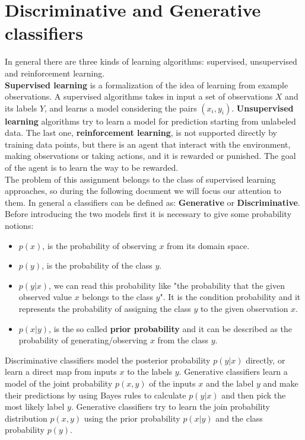 \documentclass[11pt,a4paper]{article}
\begin{document}
\section{Discriminative and Generative classifiers}
In general there are three kinds of learning algorithms: supervised, unsupervised and reinforcement learning.\\
\textbf{Supervised learning} is a formalization of the idea of learning from example observations. A supervised algorithms takes in input a set of observations $X$ and its labels $Y$, and learns a model considering the pairs $(x_i, y_i)$.
\textbf{Unsupervised learning} algorithms try to learn a model for prediction starting from unlabeled data. The last one, \textbf{reinforcement learning}, is not supported directly by training data points, but there is an agent that interact with the environment, making observations or taking actions, and it is rewarded or punished. The goal of the agent is to learn the way to be rewarded.\\
The problem of this assignment belongs to the class of supervised learning approaches, so during the following document we will focus our attention to them.
In general a classifiers can be defined as: \textbf{Generative} or \textbf{Discriminative}.
Before introducing the two models first it is necessary to give some probability notions:
\begin{itemize}
	\item $p(x)$, is the probability of observing $x$ from its domain space.
	\item $p(y)$, is the probability of the class $y$.
	\item $p(y|x)$, we can read this probability like "the probability that the given observed value $x$ belongs to the class $y$". It is the condition probability and it represents the probability of assigning the class $y$ to the given observation $x$.
	\item $p(x|y)$, is the so called \textbf{prior probability} and it can be described as the probability of generating/observing $x$ from the class $y$.
\end{itemize}
Discriminative classifiers model the posterior probability $p(y|x)$ directly, or learn a direct map from inputs $x$ to the labels $y$.
Generative classifiers learn a model of the joint probability $p(x,y)$ of the inputs $x$ and the label $y$ and make their predictions by using Bayes rules to calculate $p(y|x)$ and then pick the most likely label $y$. Generative classifiers try to learn the join probability distribution $p(x,y)$ using the prior probability $p(x|y)$ and the class probability $p(y)$.
\end{document}
